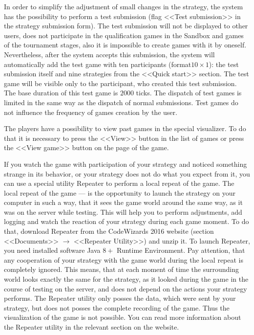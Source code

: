 In order to simplify the adjustment of small changes in the strategy, the system has the possibility to perform a test submission (flag <<Test submission>>
in the strategy submission form). The test submission will not be displayed to other users, does not participate in the qualification games in the Sandbox and
games of the tournament stages, also it is impossible to create games with it by oneself. Nevertheless, after the system accepts this submission, the system
will automatically add the test game with ten participants (format$10\times1$): the test submission itself and nine strategies from
the <<Quick start>> section. The test game will be visible only to the participant, who created this test submission. The base duration of this test
game is $2000$ ticks. The dispatch of test games is limited in the same way as the dispatch of normal submissions. Test games do not influence
the frequency of games creation by the user.
 
The players have a possibility to view past games in the special visualizer. To do that it is necessary to press the <<View>> button in the list of games
or press the <<View game>> button on the page of the game.
 
If you watch the game with participation of your strategy and noticed something strange in its behavior, or your strategy does not do what you
expect from it, you can use a special utility Repeater to perform a local repeat of the game. The local repeat of the
game --- is the opportunity to launch the strategy on your computer in such a way, that it sees the game world around the same way, as it was on
the server while testing. This will help you to perform adjustments, add logging and watch the reaction of your strategy during each game
moment. To do that, download Repeater from the CodeWizards 2016 website (section <<Documents>> $\rightarrow$ <<Repeater Utility>>) and unzip it.
To launch Repeater, you need installed software Java $8+$ Runtime Environment. Pay attention, that any cooperation of your
strategy with the game world during the local repeat is completely ignored. This means, that at each moment of time the surrounding world
looks exactly the same for the strategy, as it looked during the game in the course of testing on the server, and does not depend on the actions your strategy
performs. The Repeater utility only posses the data, which were sent by your strategy, but does not posses the complete recording of the game. Thus
the visualization of the game is not possible. You can read more information about the Repeater utility in the relevant section on the website.
 
